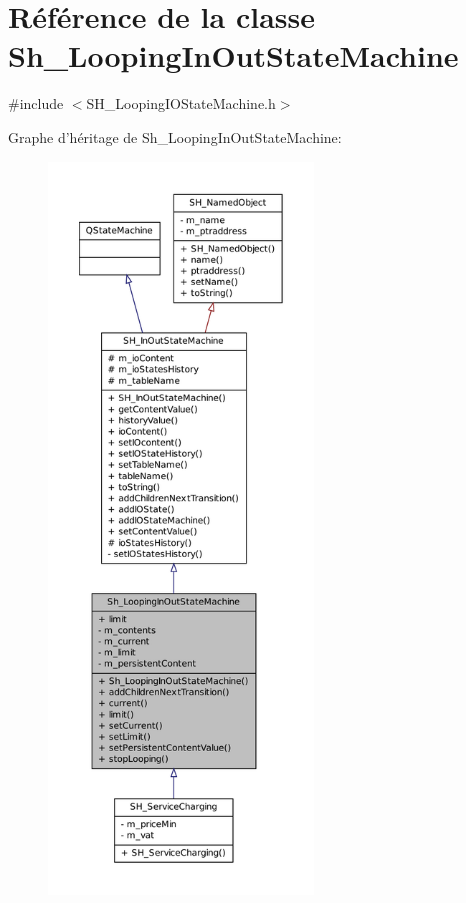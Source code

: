 \hypertarget{classSh__LoopingInOutStateMachine}{\section{Référence de la classe Sh\-\_\-\-Looping\-In\-Out\-State\-Machine}
\label{classSh__LoopingInOutStateMachine}
}


{\ttfamily \#include $<$S\-H\-\_\-\-Looping\-I\-O\-State\-Machine.\-h$>$}



Graphe d'héritage de Sh\-\_\-\-Looping\-In\-Out\-State\-Machine\-:\nopagebreak
\begin{figure}[H]
\begin{center}
\leavevmode
\includegraphics[height=550pt]{classSh__LoopingInOutStateMachine__inherit__graph}
\end{center}
\end{figure}


